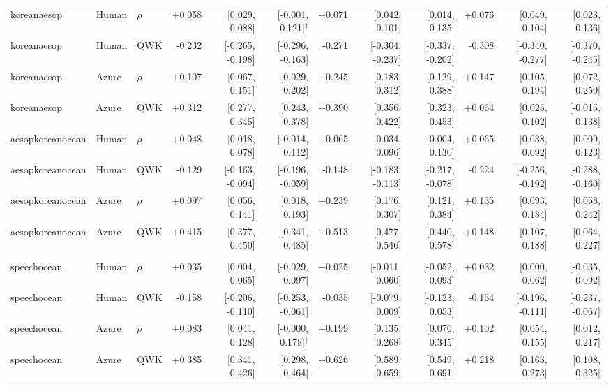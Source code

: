 \documentclass[10pt]{article}
\begin{document}
\begin{landscape}
\begin{longtable}{@{}lllrrrrrrrrr@{}}
\addlinespace[2pt]
koreanaesop & Human & $\rho$ & +0.058 & [0.029, 0.088] & [-0.001, 0.121]$^{\dagger}$ & +0.071 & [0.042, 0.101] & [0.014, 0.135] & +0.076 & [0.049, 0.104] & [0.023, 0.136]\\
koreanaesop & Human & QWK & -0.232 & [-0.265, -0.198] & [-0.296, -0.163] & -0.271 & [-0.304, -0.237] & [-0.337, -0.202] & -0.308 & [-0.340, -0.277] & [-0.370, -0.245]\\
koreanaesop & Azure & $\rho$ & +0.107 & [0.067, 0.151] & [0.029, 0.202] & +0.245 & [0.183, 0.312] & [0.129, 0.388] & +0.147 & [0.105, 0.194] & [0.072, 0.250]\\
koreanaesop & Azure & QWK & +0.312 & [0.277, 0.345] & [0.243, 0.378] & +0.390 & [0.356, 0.422] & [0.323, 0.453] & +0.064 & [0.025, 0.102] & [-0.015, 0.138]\\
\addlinespace[2pt]
aesopkoreanocean & Human & $\rho$ & +0.048 & [0.018, 0.078] & [-0.014, 0.112] & +0.065 & [0.034, 0.096] & [0.004, 0.130] & +0.065 & [0.038, 0.092] & [0.009, 0.123]\\
aesopkoreanocean & Human & QWK & -0.129 & [-0.163, -0.094] & [-0.196, -0.059] & -0.148 & [-0.183, -0.113] & [-0.217, -0.078] & -0.224 & [-0.256, -0.192] & [-0.288, -0.160]\\
aesopkoreanocean & Azure & $\rho$ & +0.097 & [0.056, 0.141] & [0.018, 0.193] & +0.239 & [0.176, 0.307] & [0.121, 0.384] & +0.135 & [0.093, 0.184] & [0.058, 0.242]\\
aesopkoreanocean & Azure & QWK & +0.415 & [0.377, 0.450] & [0.341, 0.485] & +0.513 & [0.477, 0.546] & [0.440, 0.578] & +0.148 & [0.107, 0.188] & [0.064, 0.227]\\
\addlinespace[2pt]
\midrule\multicolumn{12}{l}{\textbf{3RB-C: three-ratio banded, construct-wise correlation}}\\*
speechocean & Human & $\rho$ & +0.035 & [0.004, 0.065] & [-0.029, 0.097] & +0.025 & [-0.011, 0.060] & [-0.052, 0.093] & +0.032 & [0.000, 0.062] & [-0.035, 0.092]\\
speechocean & Human & QWK & -0.158 & [-0.206, -0.110] & [-0.253, -0.061] & -0.035 & [-0.079, 0.009] & [-0.123, 0.053] & -0.154 & [-0.196, -0.111] & [-0.237, -0.067]\\
speechocean & Azure & $\rho$ & +0.083 & [0.041, 0.128] & [-0.000, 0.178]$^{\dagger}$ & +0.199 & [0.135, 0.268] & [0.076, 0.345] & +0.102 & [0.054, 0.155] & [0.012, 0.217]\\
speechocean & Azure & QWK & +0.385 & [0.341, 0.426] & [0.298, 0.464] & +0.626 & [0.589, 0.659] & [0.549, 0.691] & +0.218 & [0.163, 0.273] & [0.108, 0.325]\\

\end{longtable}
\end{landscape}
\end{document}
